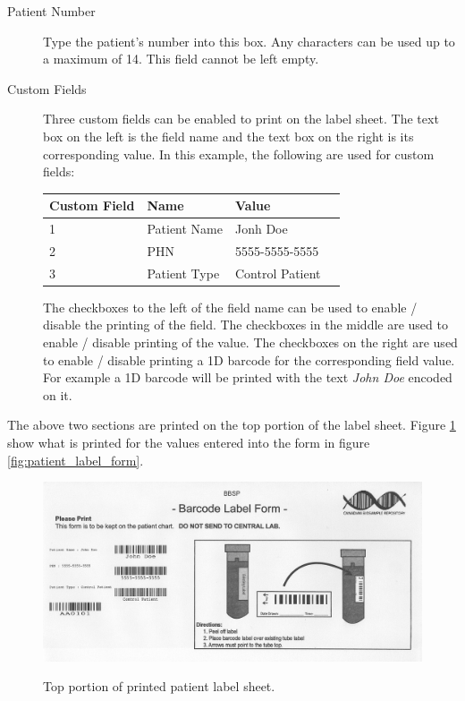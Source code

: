 \begin{description}
\item[Patient Number] Type the patient's number into this box. Any characters
  can be used up to a maximum of 14. This field cannot be left empty.
\item[Custom Fields] Three custom fields can be enabled to print on the
  label sheet. The text box on the left is the field name and the text box on
  the right is its corresponding value. In this example, the following are used
  for custom fields:

  \begin{center}
    \begin{tabular}{ | l | l | l | p{5cm} |}
      \hline
      Custom Field & Name & Value \\ \hline
      1 & Patient Name & Jonh Doe \\ \hline
      2 & PHN & 5555-5555-5555 \\ \hline
      3 & Patient Type & Control Patient \\
      \hline
    \end{tabular}
  \end{center}

  The checkboxes to the left of the field name can be used to enable / disable
  the printing of the field. The checkboxes in the middle are used to enable /
  disable printing of the value. The checkboxes on the right are used to enable
  / disable printing a 1D barcode for the corresponding field value. For
  example a 1D barcode will be printed with the text \emph{John Doe} encoded on
  it.
\end{description}

The above two sections are printed on the top portion of the label
sheet. Figure \ref{fig:printed_sheet_top} show what is printed for the values
entered into the form in figure \ref{fig:patient_label_form}.

\begin{figure}[H]
  \centering
  \scalebox{0.6}
	   { \includegraphics*{screenshots/printer_labels/04_printed_patient_labels_top} }
	   \caption{Top portion of printed patient label sheet.}
	   \label{fig:printed_sheet_top}
\end{figure}

